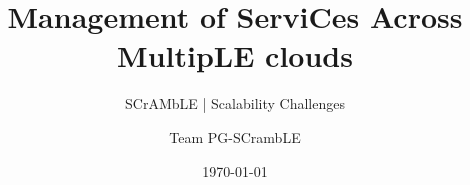 \title{Management of ServiCes Across MultipLE clouds} 

\subtitle{SCrAMbLE | Scalability Challenges}

\author{Team PG-SCrambLE}


\date{\today} 

\newcommand{\upbcolor}{uni-blue} 

